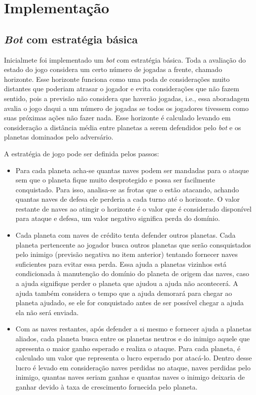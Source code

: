 \documentclass[a4paper,titlepage,11pt]{article}
\begin{document}
\section{Implementação}
\label{seq:Implementação}


\subsection{{\em Bot} com estratégia básica}
Inicialmete foi implementado um {\em bot} com estratégia básica. Toda a avaliação do estado do jogo considera um certo número de jogadas a frente, chamado horizonte. Esse horizonte funciona como uma poda de considerações muito distantes que poderiam atrasar o jogador e evita considerações que não fazem sentido, pois a previsão não considera que haverão jogadas, i.e., essa aboradagem avalia o jogo daqui a um número de jogadas se todos os jogadores tivessem como suas próximas ações não fazer nada. Esse horizonte é calculado levando em consideração a distância média entre planetas a serem defendidos pelo {\em bot} e os planetas dominados pelo adversário.

A estratégia de jogo pode ser definida pelos passos:

\begin{itemize}
	\item Para cada planeta acha-se quantas naves podem ser mandadas para o ataque sem que o planeta fique muito 		desprotegido e possa ser facilmente conquistado. 
Para isso, analisa-se as frotas que o estão atacando, achando quantas naves de defesa ele perderia a cada turno até o horizonte. O valor restante de naves ao atingir o horizonte é o valor que é considerado disponível para ataque e defesa, um valor negativo significa perda do domínio.
	\item Cada planeta com naves de crédito tenta defender outros planetas.
Cada planeta pertencente ao jogador busca outros planetas que serão consquistados pelo inimigo (previsão negativa no item anterior) tentando fornecer naves suficientes para evitar essa perda. Essa ajuda a planetas vizinhos está condicionada à manutenção do domínio do planeta de origem das naves, caso a ajuda signifique perder o planeta que ajudou a ajuda não acontecerá. A ajuda também considera o tempo que a ajuda demorará para chegar ao planeta ajudado, se ele for conquistado antes de ser possível chegar a ajuda ela não será enviada.
	\item Com as naves restantes, após defender a si mesmo e fornecer ajuda a planetas aliados, cada planeta busca entre os planetas neutros e do inimigo aquele que apresenta o maior ganho esperado e realiza o ataque.
Para cada planeta, é calculado um valor que representa o lucro esperado por atacá-lo. Dentro desse lucro é levado em consideração naves perdidas no ataque, naves perdidas pelo inimigo, quantas naves seriam ganhas e quantas naves o inimigo deixaria de ganhar devido à taxa de crescimento fornecida pelo planeta.
\end{itemize}
\end{document}
